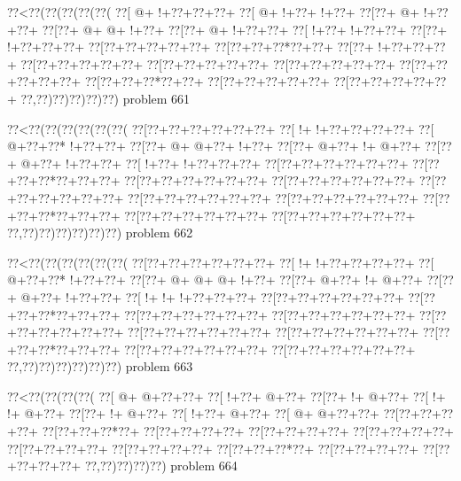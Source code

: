 \vbox{\vbox{\goo
\0??<\0??(\0??(\0??(\0??(\0??(
\0??[\- @+\- !+\0??+\0??+\0??+
\0??[\- @+\- !+\0??+\- !+\0??+
\0??[\0??+\- @+\- !+\0??+\0??+
\0??[\0??+\- @+\- @+\- !+\0??+
\0??[\0??+\- @+\- !+\0??+\0??+
\0??[\- !+\0??+\- !+\0??+\0??+
\0??[\0??+\- !+\0??+\0??+\0??+
\0??[\0??+\0??+\0??+\0??+\0??+
\0??[\0??+\0??+\0??*\0??+\0??+
\0??[\0??+\- !+\0??+\0??+\0??+
\0??[\0??+\0??+\0??+\0??+\0??+
\0??[\0??+\0??+\0??+\0??+\0??+
\0??[\0??+\0??+\0??+\0??+\0??+
\0??[\0??+\0??+\0??+\0??+\0??+
\0??[\0??+\0??+\0??*\0??+\0??+
\0??[\0??+\0??+\0??+\0??+\0??+
\0??[\0??+\0??+\0??+\0??+\0??+
\0??,\0??)\0??)\0??)\0??)\0??)
}
\hfil problem 661\hfil\break
}

\vbox{\vbox{\goo
\0??<\0??(\0??(\0??(\0??(\0??(\0??(
\0??[\0??+\0??+\0??+\0??+\0??+\0??+
\0??[\- !+\- !+\0??+\0??+\0??+\0??+
\0??[\- @+\0??+\0??*\- !+\0??+\0??+
\0??[\0??+\- @+\- @+\0??+\- !+\0??+
\0??[\0??+\- @+\0??+\- !+\- @+\0??+
\0??[\0??+\- @+\0??+\- !+\0??+\0??+
\0??[\- !+\0??+\- !+\0??+\0??+\0??+
\0??[\0??+\0??+\0??+\0??+\0??+\0??+
\0??[\0??+\0??+\0??*\0??+\0??+\0??+
\0??[\0??+\0??+\0??+\0??+\0??+\0??+
\0??[\0??+\0??+\0??+\0??+\0??+\0??+
\0??[\0??+\0??+\0??+\0??+\0??+\0??+
\0??[\0??+\0??+\0??+\0??+\0??+\0??+
\0??[\0??+\0??+\0??+\0??+\0??+\0??+
\0??[\0??+\0??+\0??*\0??+\0??+\0??+
\0??[\0??+\0??+\0??+\0??+\0??+\0??+
\0??[\0??+\0??+\0??+\0??+\0??+\0??+
\0??,\0??)\0??)\0??)\0??)\0??)\0??)
}
\hfil problem 662\hfil\break
}

\vbox{\vbox{\goo
\0??<\0??(\0??(\0??(\0??(\0??(\0??(
\0??[\0??+\0??+\0??+\0??+\0??+\0??+
\0??[\- !+\- !+\0??+\0??+\0??+\0??+
\0??[\- @+\0??+\0??*\- !+\0??+\0??+
\0??[\0??+\- @+\- @+\- @+\- !+\0??+
\0??[\0??+\- @+\0??+\- !+\- @+\0??+
\0??[\0??+\- @+\0??+\- !+\0??+\0??+
\0??[\- !+\- !+\- !+\0??+\0??+\0??+
\0??[\0??+\0??+\0??+\0??+\0??+\0??+
\0??[\0??+\0??+\0??*\0??+\0??+\0??+
\0??[\0??+\0??+\0??+\0??+\0??+\0??+
\0??[\0??+\0??+\0??+\0??+\0??+\0??+
\0??[\0??+\0??+\0??+\0??+\0??+\0??+
\0??[\0??+\0??+\0??+\0??+\0??+\0??+
\0??[\0??+\0??+\0??+\0??+\0??+\0??+
\0??[\0??+\0??+\0??*\0??+\0??+\0??+
\0??[\0??+\0??+\0??+\0??+\0??+\0??+
\0??[\0??+\0??+\0??+\0??+\0??+\0??+
\0??,\0??)\0??)\0??)\0??)\0??)\0??)
}
\hfil problem 663\hfil\break
}

\vbox{\vbox{\goo
\0??<\0??(\0??(\0??(\0??(
\0??[\- @+\- @+\0??+\0??+
\0??[\- !+\0??+\- @+\0??+
\0??[\0??+\- !+\- @+\0??+
\0??[\- !+\- !+\- @+\0??+
\0??[\0??+\- !+\- @+\0??+
\0??[\- !+\0??+\- @+\0??+
\0??[\- @+\- @+\0??+\0??+
\0??[\0??+\0??+\0??+\0??+
\0??[\0??+\0??+\0??*\0??+
\0??[\0??+\0??+\0??+\0??+
\0??[\0??+\0??+\0??+\0??+
\0??[\0??+\0??+\0??+\0??+
\0??[\0??+\0??+\0??+\0??+
\0??[\0??+\0??+\0??+\0??+
\0??[\0??+\0??+\0??*\0??+
\0??[\0??+\0??+\0??+\0??+
\0??[\0??+\0??+\0??+\0??+
\0??,\0??)\0??)\0??)\0??)
}
\hfil problem 664\hfil\break
}

